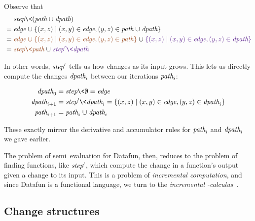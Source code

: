 \newcommand\colorpath{{\color{BlindVermilion}\name{path}}}
\newcommand\colordpath{{\color{BlindBlue}\name{dpath}}}
\newcommand\colorA{\color{ColorA}}
\newcommand\colorB{\color{ColorB}}
\renewcommand\colorpath{\name{path}}
\renewcommand\colordpath{\name{dpath}}

\noindent
Observe that
%
\begin{align*}
  &\mathrel{\hphantom{=}} \name{step} \<(\colorpath \cup \colordpath)
  \\
  &= \name{edge} \cup \setfor{(x,z)}{(x,y) \in \name{edge}, (y,z) \in \colorpath \cup \colordpath}
  \\
  &= {\colorA \name{edge} \cup \setfor{(x,z)}{(x,y) \in \name{edge}, (y,z) \in \colorpath}} \cup {\colorB \setfor{(x,z)}{(x,y) \in \name{edge}, (y,z) \in \colordpath}}
  \\
  &= {\colorA\name{step}\<\colorpath} \cup {\colorB\name{step}'\<\colordpath}
\end{align*}

\noindent
In other words, $\text{\itshape step}'$ tells us how  changes as its input
grows.
%
This lets us directly compute the changes $\text{\itshape dpath}_i$ between our
iterations $\text{\itshape path}_i$:

\begin{align*}
  \name{dpath}_0
  &= \name{step}\<\emptyset
  = \name{edge}
  \\
  \name{dpath}_{i+1}
  &= \name{step}'\<\name{dpath}_i
  = \setfor{(x,z)}{(x,y) \in \name{edge}, (y,z) \in \name{dpath}_i}
  \\
  \name{path}_{i+1}
  &= \name{path}_i \cup \name{dpath}_i
\end{align*}

\noindent These exactly mirror the derivative and accumulator rules for
\(\text{\itshape path}_i\) and \(\text{\itshape dpath}_i\) we gave earlier.


The problem of semi\naive\ evaluation for Datafun, then, reduces to the problem
of finding functions, like $\text{\itshape step}'$, which compute the change in a
function's output given a change to its input.
%
This is a problem of \emph{incremental computation}, and since Datafun is a
functional language, we turn to the \emph{incremental
  \fn-calculus}~\citep{incremental,DBLP:conf/esop/GiarrussoRS19}.


\subsection{Change structures}
\label{sec:change-structures}

